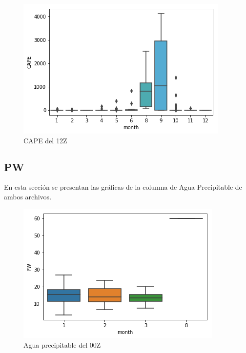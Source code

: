 \documentclass{article}
\begin{document}
\begin{figure}[H]
\includegraphics[width=\linewidth]{CAPE12Z.png}
\caption {CAPE del 12Z}
\end{figure}

\subsection{PW}
En esta sección se presentan las gráficas de la columna de Agua Precipitable de ambos archivos.

\begin{figure}[H]
\includegraphics[width=\linewidth]{PW00Z.png}
\caption{Agua precipitable del 00Z}
\end{figure}
\end{document}
